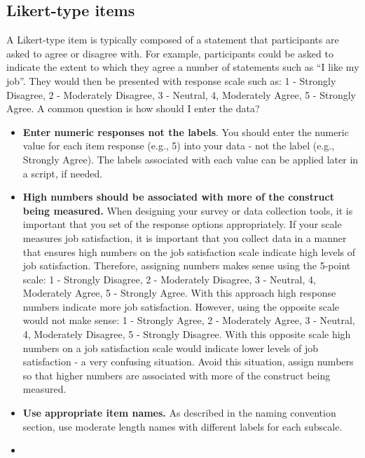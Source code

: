 \documentclass[
]{krantz}
\begin{document}
\hypertarget{likert-type-items}{%
\subsection{Likert-type items}\label{likert-type-items}}

A Likert-type item is typically composed of a statement that participants are asked to agree or disagree with. For example, participants could be asked to indicate the extent to which they agree a number of statements such as ``I like my job''. They would then be presented with response scale such as: 1 - Strongly Disagree, 2 - Moderately Disagree, 3 - Neutral, 4, Moderately Agree, 5 - Strongly Agree. A common question is how should I enter the data?

\begin{itemize}
\item
  \textbf{Enter numeric responses not the labels}. You should enter the numeric value for each item response (e.g., 5) into your data - not the label (e.g., Strongly Agree). The labels associated with each value can be applied later in a script, if needed.
\item
  \textbf{High numbers should be associated with more of the construct being measured.} When designing your survey or data collection tools, it is important that you set of the response options appropriately. If your scale measures job satisfaction, it is important that you collect data in a manner that ensures high numbers on the job satisfaction scale indicate high levels of job satisfaction. Therefore, assigning numbers makes sense using the 5-point scale: 1 - Strongly Disagree, 2 - Moderately Disagree, 3 - Neutral, 4, Moderately Agree, 5 - Strongly Agree. With this approach high response numbers indicate more job satisfaction. However, using the opposite scale would not make sense: 1 - Strongly Agree, 2 - Moderately Agree, 3 - Neutral, 4, Moderately Disagree, 5 - Strongly Disagree. With this opposite scale high numbers on a job satisfaction scale would indicate lower levels of job satisfaction - a very confusing situation. Avoid this situation, assign numbers so that higher numbers are associated with more of the construct being measured.
\item
  \textbf{Use appropriate item names.} As described in the naming convention section, use moderate length names with different labels for each subscale.
\item

\end{itemize}
\end{document}
